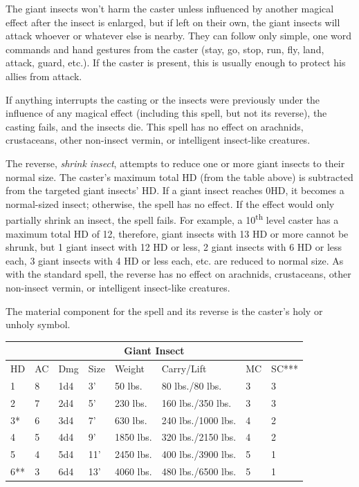 \begin{multicols}{2}
The giant insects won't harm the caster unless influenced by another magical effect after the insect is enlarged, but if left on their own, the giant insects will attack whoever or whatever else is nearby.  They can follow only simple, one word commands and hand gestures from the caster (stay, go, stop, run, fly, land, attack, guard, etc.).  If the caster is present, this is usually enough to protect his allies from attack.

If anything interrupts the casting or the insects were previously under the influence of any magical effect (including this spell, but not its reverse), the casting fails, and the insects die.  This spell has no effect on arachnids, crustaceans, other non-insect vermin, or intelligent insect-like creatures.

The reverse, \textit{shrink insect}, attempts to reduce one or more giant insects to their normal size.  The caster's maximum total HD (from the table above) is subtracted from the targeted giant insects' HD.  If a giant insect reaches 0HD, it becomes a normal-sized insect; otherwise, the spell has no effect.  If the effect would only partially shrink an insect, the spell fails.  For example, a 10\textsuperscript{th} level caster has a maximum total HD of 12, therefore, giant insects with 13 HD or more cannot be shrunk, but 1 giant insect with 12 HD or less, 2 giant insects with 6 HD or less each, 3 giant insects with 4 HD or less each, etc. are reduced to normal size.  As with the standard spell, the reverse has no effect on arachnids, crustaceans, other non-insect vermin, or intelligent insect-like creatures.

The material component for the spell and its reverse is the caster's holy or unholy symbol.

\end{multicols}

\noindent
\begin{tabular}{|p{}|p{}|p{}|p{}|p{}|p{}|p{}|p{}|}
\multicolumn{8}{c}{Giant Insect} \\
\hline
HD	& AC	& Dmg	& Size	& Weight	& Carry/Lift	& MC	& SC*** \\
\hline\hline
\rowcolor[gray]{.9}1	& 8	& 1d4	& 3'	& 50 lbs.	& 80 lbs./80 lbs.	& 3	& 3 \\
2	& 7	& 2d4	& 5'	& 230 lbs.	& 160 lbs./350 lbs.	& 3	& 3 \\
\rowcolor[gray]{.9}3*	& 6	& 3d4	& 7'	& 630 lbs.	& 240 lbs./1000 lbs.	& 4	& 2 \\
4	& 5	& 4d4	& 9'	& 1850 lbs.	& 320 lbs./2150 lbs.	& 4	& 2 \\
\rowcolor[gray]{.9}5	& 4	& 5d4	& 11'	& 2450 lbs.	& 400 lbs./3900 lbs.	& 5	& 1 \\
6**	& 3	& 6d4	& 13'	& 4060 lbs.	& 480 lbs./6500 lbs.	& 5	& 1 \\
\hline
\end{tabular}

